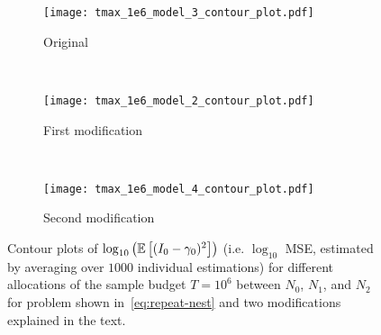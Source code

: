 \begin{figure}[t]
	\centering
	\begin{subfigure}[b]{0.32\textwidth}
		\centering
		\texttt{[image: tmax\_1e6\_model\_3\_contour\_plot.pdf]}
		\caption{Original}
	\end{subfigure}
	~\hspace{4pt}
	\begin{subfigure}[b]{0.32\textwidth}
		\centering
		\texttt{[image: tmax\_1e6\_model\_2\_contour\_plot.pdf]}
		\caption{First modification}
	\end{subfigure}
	~\hspace{-3pt}
	\begin{subfigure}[b]{0.32\textwidth}
		\centering
		\texttt{[image: tmax\_1e6\_model\_4\_contour\_plot.pdf]}
		\caption{Second modification}
	\end{subfigure}
	\vspace{5pt}
	\caption{Contour plots of $\log_{10} \left(\mathbb{E} \left[(I_0-\gamma_0)^2\right]\right)$ (i.e. $\log_{10}$ MSE, estimated
		by averaging over $1000$ individual estimations)
		for different allocations of the sample budget $T=10^6$ between $N_0$, $N_1$,
		and $N_2$ for problem shown in~\eqref{eq:repeat-nest} and two modifications explained in
		the text.
		\label{fig:multi-tau}}
\end{figure}	